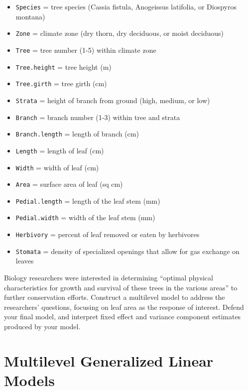 \documentclass[
]{krantz}
\providecommand{\tightlist}{%
  \setlength{\itemsep}{0pt}\setlength{\parskip}{0pt}}
\begin{document}
\begin{enumerate}
  \begin{itemize}
  \tightlist
  \item
    \texttt{Species} = tree species (Cassia fistula, Anogeissus latifolia, or Diospyros montana)
  \item
    \texttt{Zone} = climate zone (dry thorn, dry deciduous, or moist deciduous)
  \item
    \texttt{Tree} = tree number (1-5) within climate zone
  \item
    \texttt{Tree.height} = tree height (m)
  \item
    \texttt{Tree.girth} = tree girth (cm)
  \item
    \texttt{Strata} = height of branch from ground (high, medium, or low)
  \item
    \texttt{Branch} = branch number (1-3) within tree and strata
  \item
    \texttt{Branch.length} = length of branch (cm)
  \item
    \texttt{Length} = length of leaf (cm)
  \item
    \texttt{Width} = width of leaf (cm)
  \item
    \texttt{Area} = surface area of leaf (sq cm)
  \item
    \texttt{Pedial.length} = length of the leaf stem (mm)
  \item
    \texttt{Pedial.width} = width of the leaf stem (mm)
  \item
    \texttt{Herbivory} = percent of leaf removed or eaten by herbivores
  \item
    \texttt{Stomata} = density of specialized openings that allow for gas exchange on leaves
  \end{itemize}

  Biology researchers were interested in determining ``optimal physical characteristics for growth and survival of these trees in the various areas'' to further conservation efforts. Construct a multilevel model to address the researchers' questions, focusing on leaf area as the response of interest. Defend your final model, and interpret fixed effect and variance component estimates produced by your model.
\end{enumerate}

\hypertarget{ch-GLMM}{%
\chapter{Multilevel Generalized Linear Models}\label{ch-GLMM}}
\end{document}
